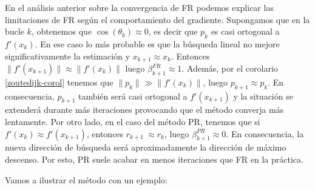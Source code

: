 En el análisis anterior sobre la convergencia de FR podemos explicar las limitaciones de FR según el comportamiento del gradiente. Supongamos que en la bucle $k$, obtenemos que $\cos(\theta_k)\approx 0$, es decir que $p_k$ es casi ortogonal a $f'(x_k)$. En ese caso lo más probable es que la búsqueda lineal no mejore significativamente la estimación y $x_{k+1}\approx x_k$. Entonces $\|f'(x_{k+1})\|\approx\|f'(x_k)\|$ luego $\beta_{k+1}^{FR} \approx 1$. Además, por el corolario \ref{zoutedijk-corol} tenemos que $\|p_k\|\gg \|f'(x_k)\|$, luego $p_{k+1} \approx p_k$. En consecuencia, $p_{k+1}$ también será casi ortogonal a $f'(x_{k+1})$ y la situación se extenderá durante más iteraciones provocando que el método converja más lentamente. Por otro lado, en el caso del método PR, tenemos que si $f'(x_k) \approx f'(x_{k+1})$, entonces $r_{k+1} \ \approx r_k$, luego $\beta_{k+1}^{PR} \approx 0$. En consecuencia, la nueva dirección de búsqueda será aproximadamente la dirección de máximo descenso. Por esto, PR suele acabar en menos iteraciones que FR en la práctica.







Vamos a ilustrar el método con un ejemplo:

